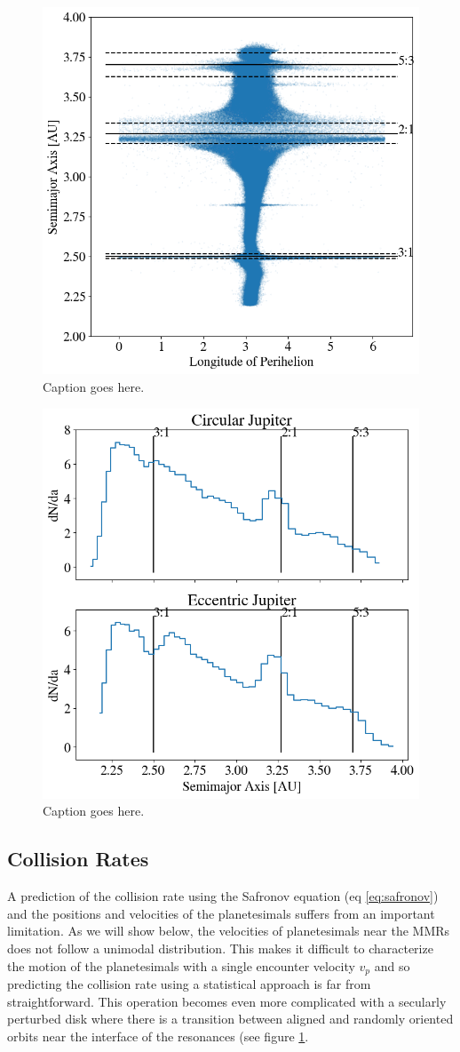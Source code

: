 \documentclass[onecolumn]{aastex63}
\begin{document}
\begin{figure}
    \begin{center}
    \includegraphics[width=0.4\columnwidth]{figures/long_ph.png}
    \caption{Caption goes here.\label{fig:long_ph}}
    \end{center}
\end{figure}

\begin{figure}
    \begin{center}
    \includegraphics[width=0.4\columnwidth]{figures/coll_hist_a.png}
    \caption{Caption goes here.\label{fig:coll_hist_a}}
    \end{center}
\end{figure}

\subsection{Collision Rates}\label{sec:coll_rates}

A prediction of the collision rate using the Safronov equation (eq \ref{eq:safronov}) and the positions and velocities of the planetesimals
suffers from an important limitation. As we will show below, the velocities of planetesimals near the MMRs does not follow a unimodal 
distribution. This makes it difficult to characterize the motion of the planetesimals with a single encounter velocity $v_{p}$ and so predicting 
the collision rate using a statistical approach is far from straightforward. This operation becomes even more complicated with a secularly 
perturbed disk where there is a transition between aligned and randomly oriented orbits near the interface of the resonances (see figure 
\ref{fig:long_ph}.
\end{document}

